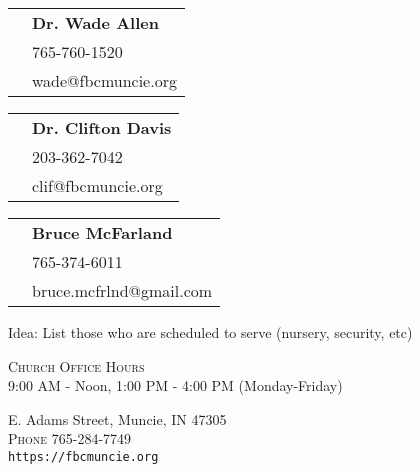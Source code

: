 \documentclass[
notumble,
nofoldmark,
letterpaper,
10pt,
]{leaflet}
\newcommand{\phone}[1]{\small{\faPhone \hspace{.2em} #1}}
\newcommand{\email}[1]{\small{\faEnvelopeO \hspace{.2em} #1}}
\newcommand{\pastor}[4]{
\begin{tabular}{r l}
\textsc{\multirow[t]{3}{8em}{#1}} & \textbf{#2} \\
 & \phone{#3} \\
 & \email{#4} \\
 \end{tabular}
 \newline
\vspace*{2mm}
\newline
}
\begin{document}
\vspace{5mm}



\pagebreak

\pastor{Pastor}{Dr. Wade Allen}{765-760-1520}{wade@fbcmuncie.org}
\pastor{Worship Arts Pastor}{Dr. Clifton Davis}{203-362-7042}{clif@fbcmuncie.org}
\pastor{Choir Director}{Bruce McFarland}{765-374-6011}{bruce.mcfrlnd@gmail.com}

Idea: List those who are scheduled to serve (nursery, security, etc)

\vfill


\centering
\textsc{Church Office Hours} \\
9:00 AM - Noon, 1:00 PM - 4:00 PM (Monday-Friday)

\medskip

 E. Adams Street, Muncie, IN 47305\\
\textsc{Phone} 765-284-7749\\
\texttt{https://fbcmuncie.org}

\loggingall
\end{document}

